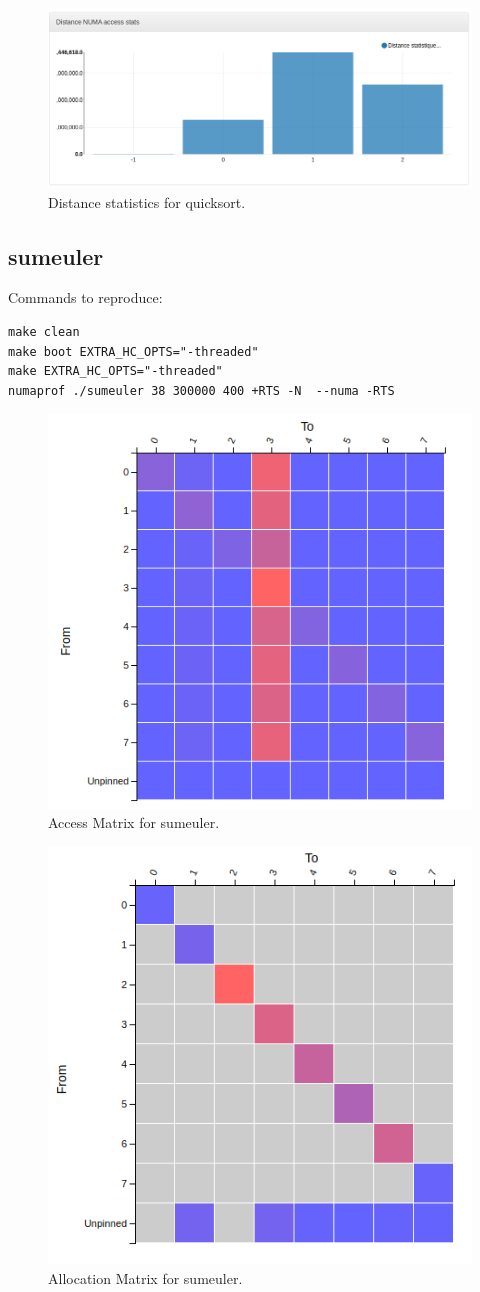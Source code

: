 \documentclass[a4paper,11pt]{article}
\begin{document}
\begin{figure}[!htb]
    \centering
    \includegraphics[width=\linewidth]{TechMemo/results/quicksort/quicksort_distance.png}
    \caption{Distance statistics for quicksort.}
    \label{fig:quicksort_distance}
\end{figure}

\subsection{sumeuler}

Commands to reproduce:
\begin{lstlisting}
make clean
make boot EXTRA_HC_OPTS="-threaded"
make EXTRA_HC_OPTS="-threaded"
numaprof ./sumeuler 38 300000 400 +RTS -N  --numa -RTS 
\end{lstlisting}

\begin{figure}[!htb]
    \centering
    \includegraphics[width=0.5\linewidth]{TechMemo/results/sumeuler/sumeukler_access.png}
    \caption{Access Matrix for sumeuler.}
    \label{fig:sumeuler_access_matrix}
\end{figure}

\begin{figure}[!htb]
    \centering
    \includegraphics[width=0.5\linewidth]{TechMemo/results/sumeuler/alloc_sumeuler.png}
    \caption{Allocation Matrix for sumeuler.}
    \label{fig:sumeuler_alloc_matrix}
\end{figure}
\end{document}
